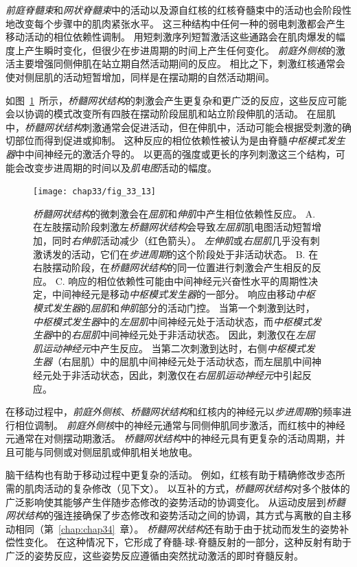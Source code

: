 \textit{前庭脊髓束}和\textit{网状脊髓束}中的活动以及源自红核的红核脊髓束中的活动也会阶段性地改变每个步骤中的肌肉紧张水平。
这三种结构中任何一种的弱电刺激都会产生移动活动的相位依赖性调制。
用短刺激序列短暂激活这些通路会在肌肉爆发的幅度上产生瞬时变化，但很少在步进周期的时间上产生任何变化。
\textit{前庭外侧核}的激活主要增强同侧伸肌在站立期自然活动期间的反应。
相比之下，刺激红核通常会使对侧屈肌的活动短暂增加，同样是在摆动期的自然活动期间。


如图~\ref{fig:33_13}~所示，\textit{桥髓网状结构}的刺激会产生更复杂和更广泛的反应，这些反应可能会以协调的模式改变所有四肢在摆动阶段屈肌和站立阶段伸肌的活动。
在屈肌中，\textit{桥髓网状结构}刺激通常会促进活动，但在伸肌中，活动可能会根据受刺激的确切部位而得到促进或抑制。
这种反应的相位依赖性被认为是由脊髓\textit{中枢模式发生器}中中间神经元的激活介导的。
以更高的强度或更长的序列刺激这三个结构，可能会改变步进周期的时间以及\textit{肌电图}活动的幅度。


\begin{figure}[htbp]
	\centering
	\texttt{[image: chap33/fig\_33\_13]}
	\caption{\textit{桥髓网状结构}的微刺激会在\textit{屈肌}和\textit{伸肌}中产生相位依赖性反应。
		A. 在左肢摆动阶段刺激左\textit{桥髓网状结构}会导致\textit{左屈肌}肌电图活动短暂增加，同时\textit{右伸肌}活动减少（红色箭头）。
		\textit{左伸肌}或\textit{右屈肌}几乎没有刺激诱发的活动，它们在\textit{步进周期}的这个阶段处于非活动状态。
		B. 在右肢摆动阶段，在\textit{桥髓网状结构}的同一位置进行刺激会产生相反的反应。
		C. 响应的相位依赖性可能由中间神经元兴奋性水平的周期性决定，中间神经元是移动\textit{中枢模式发生器}的一部分。
		响应由移动\textit{中枢模式发生器}的\textit{屈肌}和\textit{伸肌}部分的活动门控。
		当第一个刺激到达时，\textit{中枢模式发生器}中的\textit{左屈肌}中间神经元处于活动状态，而\textit{中枢模式发生器}中的\textit{右屈肌}中间神经元处于非活动状态。
		因此，刺激仅在\textit{左屈肌运动神经元}中产生反应。
		当第二次刺激到达时，右侧\textit{中枢模式发生器}（右屈肌）中的屈肌中间神经元处于活动状态，而左屈肌中间神经元处于非活动状态，因此，刺激仅在\textit{右屈肌运动神经元}中引起反应。}
	\label{fig:33_13}
\end{figure}


在移动过程中，\textit{前庭外侧核}、\textit{桥髓网状结构}和红核内的神经元以\textit{步进周期}的频率进行相位调制。
\textit{前庭外侧核}中的神经元通常与同侧伸肌同步激活，而红核中的神经元通常在对侧摆动期激活。
\textit{桥髓网状结构}中的神经元具有更复杂的活动周期，并且可能与同侧或对侧屈肌或伸肌相关地放电。


脑干结构也有助于移动过程中更复杂的活动。
例如，红核有助于精确修改步态所需的肌肉活动的复杂修改（见下文）。
以互补的方式，\textit{桥髓网状结构}对多个肢体的广泛影响使其能够产生伴随步态修改的姿势活动的协调变化。
从运动皮层到\textit{桥髓网状结构}的强连接确保了步态修改和姿势活动之间的协调，其方式与离散的自主移动相同（第~\ref{chap:chap34}~章）。
\textit{桥髓网状结构}还有助于由于扰动而发生的姿势补偿性变化。
在这种情况下，它形成了脊髓-球-脊髓反射的一部分，这种反射有助于广泛的姿势反应，这些姿势反应遵循由突然扰动激活的即时脊髓反射。



